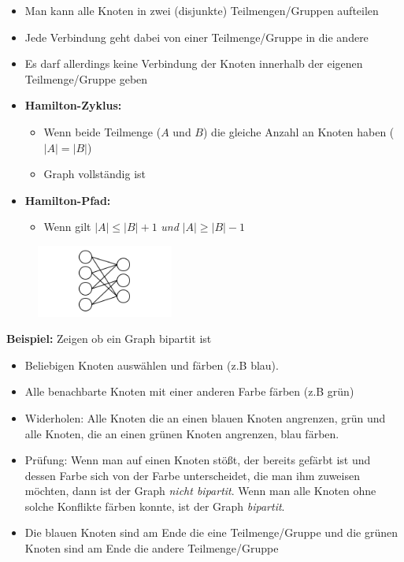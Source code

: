 \begin{itemize}
\item Man kann alle Knoten in zwei (disjunkte) Teilmengen/Gruppen aufteilen
\item Jede Verbindung geht dabei von einer Teilmenge/Gruppe in die andere
\item Es darf allerdings keine Verbindung der Knoten innerhalb der eigenen Teilmenge/Gruppe geben
\item \textbf{Hamilton-Zyklus:}
\begin{itemize}
\item Wenn beide Teilmenge ($A$ und $B$) die gleiche Anzahl an Knoten haben ($|A| = |B|$)
\item Graph vollständig ist
\end{itemize}
\item \textbf{Hamilton-Pfad:}
\begin{itemize}
\item Wenn gilt $|A| \leq |B| + 1$ \textit{und} $|A| \geq |B| - 1$
\end{itemize}
\end{itemize}

\begin{figure}[h]
\centering
\includegraphics[width=0.4\textwidth]{graphics/graph_bipartit.png}
\end{figure}

\textbf{Beispiel:} Zeigen ob ein Graph bipartit ist

\begin{itemize}
\item Beliebigen Knoten auswählen und färben (z.B blau).
\item Alle benachbarte Knoten mit einer anderen Farbe färben (z.B grün)
\item Widerholen: Alle Knoten die an einen blauen Knoten angrenzen, grün und alle Knoten, die an einen grünen Knoten angrenzen, blau färben.
\item Prüfung: Wenn man auf einen Knoten stößt, der bereits gefärbt ist und dessen Farbe sich von der Farbe unterscheidet, die man ihm zuweisen möchten, dann ist der Graph \textit{nicht bipartit}. Wenn man alle Knoten ohne solche Konflikte färben konnte, ist der Graph \textit{bipartit}.
\item Die blauen Knoten sind am Ende die eine Teilmenge/Gruppe und die grünen Knoten sind am Ende die andere Teilmenge/Gruppe
\end{itemize}

